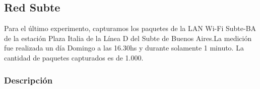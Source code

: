 \subsection{Red Subte}

Para el último experimento, capturamos los paquetes de la LAN Wi-Fi Subte-BA de la estación Plaza Italia de la Línea D del Subte de Buenos Aires.La medición fue realizada un día Domingo a las 16.30hs y durante solamente 1 minuto. La cantidad de paquetes capturados es de 1.000.

\subsubsection{Descripción}
